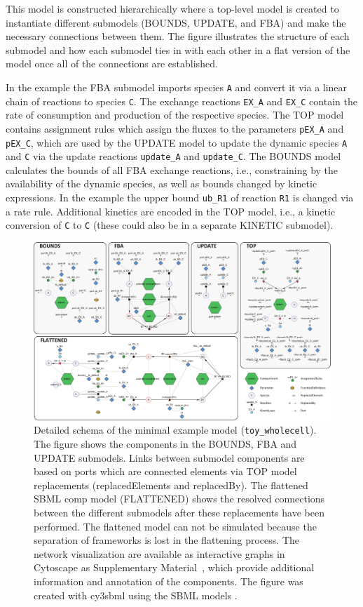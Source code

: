 \documentclass{bioinfo}
\begin{document}
This model is constructed hierarchically where a top-level model is created to instantiate different submodels (BOUNDS, UPDATE, and FBA) and make the necessary connections between them. The figure illustrates the structure of each submodel and how each submodel ties in with each other in a flat version of the model once all of the connections are established. 

In the example the FBA submodel imports species \texttt{A} and convert it via a linear chain of reactions to species \texttt{C}. The exchange reactions \texttt{EX\_A} and \texttt{EX\_C} contain the rate of consumption and production of the respective species. The TOP model contains assignment rules which assign the fluxes to the parameters \texttt{pEX\_A} and \texttt{pEX\_C}, which are used by the UPDATE model to update the dynamic species \texttt{A} and \texttt{C} via the update reactions \texttt{update\_A} and \texttt{update\_C}. The BOUNDS model calculates the bounds of all FBA exchange reactions, i.e., constraining by the availability of the dynamic species, as well as bounds changed by kinetic expressions. In the example the upper bound \texttt{ub\_R1} of reaction \texttt{R1} is changed via a rate rule. Additional kinetics are encoded in the TOP model, i.e., a kinetic conversion of \texttt{C} to \texttt{C} (these could also be in a separate KINETIC submodel).

\begin{figure}[!t]
	\centerline{\includegraphics[width=\linewidth]{figures/Fig3_toy_wholecell_schema.pdf}}
	\caption{Detailed schema of the minimal example model (\texttt{toy\_wholecell}). The figure shows the components in the BOUNDS, FBA and UPDATE submodels. Links between submodel components are based on ports which are connected elements via TOP model replacements (replacedElements and replacedBy). The flattened SBML comp model (FLATTENED) shows the resolved connections between the different submodels after these replacements have been performed. The flattened model can not be simulated because the separation of frameworks is lost in the flattening process. The network visualization are available as interactive graphs in Cytoscape as Supplementary Material~, which provide additional information and annotation of the components. The figure was created with cy3sbml using the SBML models \citep{CySBML}.}\label{fig:toy_schema}
\end{figure}
\end{document}
